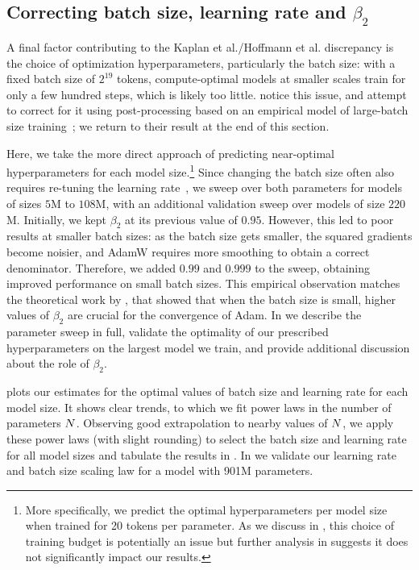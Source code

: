 \documentclass{article}
\makeatletter
\theoremstyle{plain}
\theoremstyle{definition}
\theoremstyle{remark}
\newcommand{\maybeSubscript}[1]{
  \ifthenelse{\equal{#1}{}}{}{_{#1}}%
}
\newcommand{\Kaplan}{Kaplan et al.\@\xspace}
\newcommand{\Hoffmann}{Hoffmann et al.\@\xspace}
\newcommand{\params}[1][]{N\maybeSubscript{#1}}
\makeatother
\begin{document}
\subsection{Correcting batch size, learning rate and $\beta_2$}\label{subsec:correct_hparams}
A final factor contributing to the \Kaplan/\Hoffmann discrepancy is the choice of optimization hyperparameters, particularly the batch size: with a fixed batch size of $2^{19}$ tokens, compute-optimal models at smaller scales train for only a few hundred steps, which is likely too little. 
\citet{kaplan2020scaling} notice this issue, and attempt to correct for it using post-processing based on an empirical model of large-batch size training~\cite{mccandlish2018empirical}; we return to their result at the end of this section. 

Here, we take the more direct approach of predicting near-optimal hyperparameters for each model size.\footnote{More specifically, we predict the optimal hyperparameters per model size when trained for 20 tokens per parameter. As we discuss in , this choice of training budget is potentially an issue but further analysis in  suggests it does not significantly impact our results.} Since changing the batch size often also requires re-tuning the learning rate~\cite{goyal2017accurate,mccandlish2018empirical,shallue2019measuring,zhang2019algorithmic}, we sweep over both parameters for models of sizes $5$M to $108$M, with an additional  validation sweep over models of size $220$M. Initially, we kept $\beta_2$ at its previous value of $0.95$. However, this led to poor results at smaller batch sizes: as the batch size gets smaller, the squared gradients become noisier, and AdamW requires more smoothing to obtain a correct denominator. Therefore, we added $0.99$ and $0.999$ to the sweep, obtaining improved performance on small batch sizes. This empirical observation matches the theoretical work by \citet{zhang2022adam}, that showed that when the batch size is small, higher values of $\beta_2$ are crucial for the convergence of Adam.
In  we describe the parameter sweep in full, validate the optimality of our prescribed hyperparameters on the largest model we train, and provide additional discussion about the role of $\beta_2$.

 plots our estimates for the optimal values of batch size and learning rate for each model size. It shows clear trends, to which we fit power laws in the number of parameters $\params$. Observing good extrapolation to nearby values of $\params$, we apply these power laws (with slight rounding) to select the batch size and learning rate for all model sizes and tabulate the results in . In  we validate our learning rate and batch size scaling law for a model with \num{901}M parameters.
\end{document}
